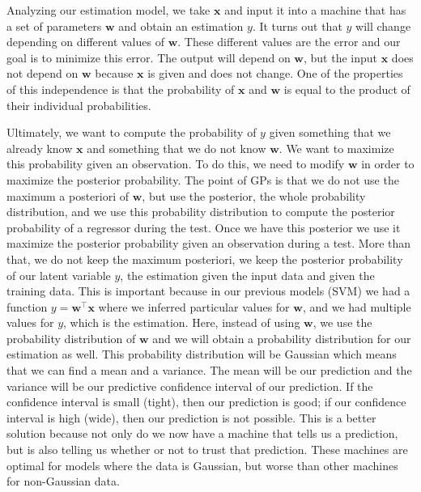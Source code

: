 \documentclass[journal]{IEEEtran}
\begin{document}
Analyzing our estimation model, we take \(\mathbf{x}\) and input it into a machine that has a set of parameters \(\mathbf{w}\) and obtain an estimation \(y\). It turns out that \(y\) will change depending on different values of \(\mathbf{w}\). These different values are the error and our goal is to minimize this error. The output will depend on \(\mathbf{w}\), but the input \(\mathbf{x}\) does not depend on \(\mathbf{w}\) because \(\mathbf{x}\) is given and does not change. One of the properties of this independence is that the probability of \(\mathbf{x}\) and \(\mathbf{w}\) is equal to the product of their individual probabilities.

Ultimately, we want to compute the probability of \(y\) given something that we already know \(\mathbf{x}\) and something that we do not know \(\mathbf{w}\). We want to maximize this probability given an observation. To do this, we need to modify \(\mathbf{w}\) in order to maximize the posterior probability. The point of GPs is that we do not use the maximum a posteriori of \(\mathbf{w}\), but use the posterior, the whole probability distribution, and we use this probability distribution to compute the posterior probability of a regressor during the test. Once we have this posterior we use it maximize the posterior probability given an observation during a test. More than that, we do not keep the maximum posteriori, we keep the posterior probability of our latent variable \(y\), the estimation given the input data and given the training data. This is important because in our previous models (SVM) we had a function \(y = \mathbf{w}^\top \mathbf{x}\) where we inferred particular values for \(\mathbf{w}\), and we had multiple values for \(y\), which is the estimation. Here, instead of using \(\mathbf{w}\), we use the probability distribution of \(\mathbf{w}\) and we will obtain a probability distribution for our estimation as well. This probability distribution will be Gaussian which means that we can find a mean and a variance. The mean will be our prediction and the variance will be our predictive confidence interval of our prediction. If the confidence interval is small (tight), then our prediction is good; if our confidence interval is high (wide), then our prediction is not possible. This is a better solution because not only do we now have a machine that tells us a prediction, but is also telling us whether or not to trust that prediction. These machines are optimal for models where the data is Gaussian, but worse than other machines for non-Gaussian data.
\end{document}
